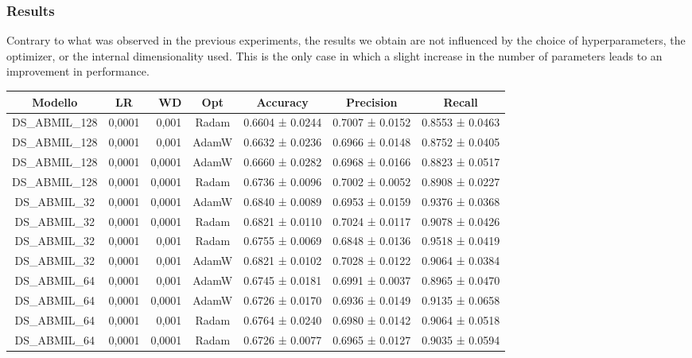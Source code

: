 \documentclass{article}
\begin{document}
\subsubsection{Results}

Contrary to what was observed in the previous experiments, the results we obtain are not influenced by the choice of hyperparameters, the optimizer, or the internal dimensionality used.
This is the only case in which a slight increase in the number of parameters leads to an improvement in performance.

\begin{table}[h]
	\centering
	\begin{tabular}{|ccrc|c|c|c|}
		\hline
		Modello & LR & WD & Opt & Accuracy & Precision & Recall \\
		\hline
		DS\_ABMIL\_128 & 0,0001 & 0,001 & Radam & 0.6604 ± 0.0244 & 0.7007 ± 0.0152 & 0.8553 ± 0.0463 \\
		DS\_ABMIL\_128 & 0,0001 & 0,001 & AdamW & 0.6632 ± 0.0236 & 0.6966 ± 0.0148 & 0.8752 ± 0.0405 \\
		DS\_ABMIL\_128 & 0,0001 & 0,0001 & AdamW & 0.6660 ± 0.0282 & 0.6968 ± 0.0166 & 0.8823 ± 0.0517 \\
		DS\_ABMIL\_128 & 0,0001 & 0,0001 & Radam & 0.6736 ± 0.0096 & 0.7002 ± 0.0052 & 0.8908 ± 0.0227 \\
		DS\_ABMIL\_32 & 0,0001 & 0,0001 & AdamW & 0.6840 ± 0.0089 & 0.6953 ± 0.0159 & 0.9376 ± 0.0368 \\
		DS\_ABMIL\_32 & 0,0001 & 0,0001 & Radam & 0.6821 ± 0.0110 & 0.7024 ± 0.0117 & 0.9078 ± 0.0426 \\
		DS\_ABMIL\_32 & 0,0001 & 0,001 & Radam & 0.6755 ± 0.0069 & 0.6848 ± 0.0136 & 0.9518 ± 0.0419 \\
		DS\_ABMIL\_32 & 0,0001 & 0,001 & AdamW & 0.6821 ± 0.0102 & 0.7028 ± 0.0122 & 0.9064 ± 0.0384 \\
		DS\_ABMIL\_64 & 0,0001 & 0,001 & AdamW & 0.6745 ± 0.0181 & 0.6991 ± 0.0037 & 0.8965 ± 0.0470 \\
		DS\_ABMIL\_64 & 0,0001 & 0,0001 & AdamW & 0.6726 ± 0.0170 & 0.6936 ± 0.0149 & 0.9135 ± 0.0658 \\
		DS\_ABMIL\_64 & 0,0001 & 0,001 & Radam & 0.6764 ± 0.0240 & 0.6980 ± 0.0142 & 0.9064 ± 0.0518\\
		DS\_ABMIL\_64 & 0,0001 & 0,0001 & Radam	&0.6726 ± 0.0077 & 0.6965 ± 0.0127 & 0.9035 ± 0.0594 \\
		\hline
	\end{tabular}
	\begin{tabular}{|ccrc|c|c|}

\end{tabular}
\end{table}
\end{document}
